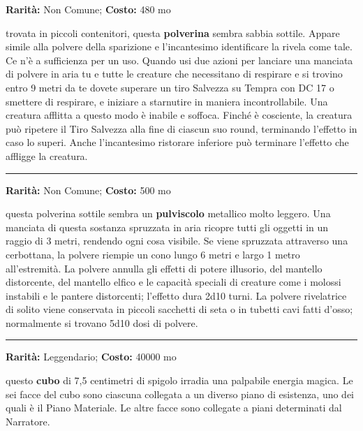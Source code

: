 \begin{multicols}{2}
\textbf{Rarità:} Non Comune; \textbf{Costo:} 480 mo

trovata in piccoli contenitori, questa \textbf{polverina} sembra sabbia sottile. Appare simile alla polvere della sparizione e l'incantesimo identificare la rivela come tale. Ce n'è a sufficienza per un uso. Quando usi due azioni per lanciare una manciata di polvere in aria tu e tutte le creature che necessitano di respirare e si trovino entro 9 metri da te dovete superare un tiro Salvezza su Tempra con DC 17 o smettere di respirare, e iniziare a starnutire in maniera incontrollabile. Una creatura afflitta a questo modo è inabile e soffoca. Finché è cosciente, la creatura può ripetere il Tiro Salvezza alla fine di ciascun suo round, terminando l'effetto in caso lo superi. Anche l'incantesimo ristorare inferiore può terminare l'effetto che affligge la creatura.

\smallskip\noindent\rule{\linewidth}{2pt}  \hypertarget{PolvereRivelatrice}{}\smallskip{}\noindent\label{PolvereRivelatrice}

\textbf{Rarità:} Non Comune; \textbf{Costo:} 500 mo

questa polverina sottile sembra un \textbf{pulviscolo} metallico molto leggero. Una manciata di questa sostanza spruzzata in aria ricopre tutti gli oggetti in un raggio di 3 metri, rendendo ogni cosa visibile. Se viene spruzzata attraverso una cerbottana, la polvere riempie un cono lungo 6 metri e largo 1 metro all'estremità. La polvere annulla gli effetti di potere illusorio, del mantello distorcente, del mantello elfico e le capacità speciali di creature come i molossi instabili e le pantere distorcenti; l'effetto dura 2d10 turni. La polvere rivelatrice di solito viene conservata in piccoli sacchetti di seta o in tubetti cavi fatti d'osso; normalmente si trovano 5d10 dosi di polvere.

\smallskip\noindent\rule{\linewidth}{2pt}  \hypertarget{PortaleCubico}{}\smallskip{}\noindent\label{PortaleCubico}

\textbf{Rarità:} Leggendario; \textbf{Costo:} 40000 mo

questo \textbf{cubo} di 7,5 centimetri di spigolo irradia una palpabile energia magica. Le sei facce del cubo sono ciascuna collegata a un diverso piano di esistenza, uno dei quali è il Piano Materiale. Le altre facce sono collegate a piani determinati dal Narratore.


\end{multicols}

